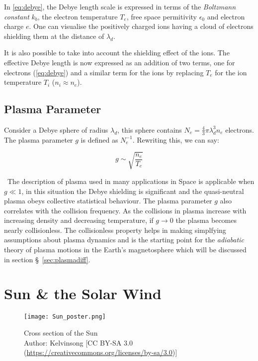 In \cref{eq:debye}, the Debye length scale is expressed in terms of the \emph{Boltzmann constant} $k_b$, 
the electron temperature $T_e$, free space permitivity $\epsilon_0$ and electron charge $e$. One can visualise the 
positively charged ions having a cloud of electrons shielding them at the distance of $\lambda_d$. 

It is also possible to take into account the shielding effect of the ions. The effective Debye length is now 
expressed as an addition of two terms, one for electrons (\cref{eq:debye}) and a similar term for the ions by replacing 
$T_e$ for the ion temperature $T_i$ ($n_i \approx n_e$). 

\subsection*{Plasma Parameter}

Consider a Debye sphere of radius $\lambda_d$, this sphere contains $N_e = \frac{4}{3}\pi \lambda^3_d n_e$ electrons. 
The plasma parameter $g$ is defined as $N_{e}^{-1}$. Rewriting this, we can say:

\begin{equation}
    g \sim \sqrt{\frac{n_e}{T_e}}
\end{equation}

~The description of plasma used in many applications in Space is applicable when $g \ll 1$, in this situation 
the Debye shielding is significant and the quasi-neutral plasma obeys collective statistical behaviour. 
The plasma parameter $g$ also correlates with the collision frequency. As the collisions in plasma increase 
with increasing density and decreasing temperature, if $g \longrightarrow 0$ the plasma becomes nearly collisionless. 
The collisionless property helps in making simplfying assumptions about plasma dynamics and is the starting point 
for the \emph{adiabatic} theory of plasma motions in the Earth's magnetosphere which will be discussed in section 
\S~\ref{sec:plasmadiff}.

\section{Sun \& the Solar Wind}\label{sec:solar}

\begin{figure}
    \noindent\centering\texttt{[image: Sun\_poster.png]}
    \caption{{\small Cross section of the Sun \\ 
    Author: Kelvinsong [CC BY-SA 3.0 (\url{https://creativecommons.org/licenses/by-sa/3.0})]}}
    \label{fig:SunLayers}
\end{figure}

